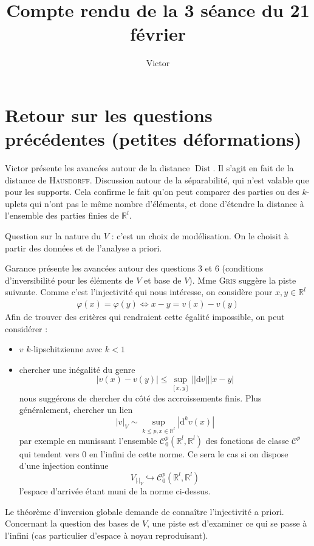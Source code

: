 \documentclass{article}
\title{Compte rendu de la 3\up{e} séance du 21 février}
\author{Victor}
\newcommand*{\Rl}{\mathbb{R}^l}
\newcommand*{\diff}{\mathrm{d}}
\DeclareMathOperator{\Dist}{Dist}
\begin{document}
\maketitle

\section{Retour sur les questions précédentes (petites déformations)}

Victor présente les avancées autour de la distance \( \Dist \). Il s'agit en fait de la distance de \textsc{Hausdorff}. Discussion autour de la séparabilité, qui n'est valable que pour les supports. Cela confirme le fait qu'on peut comparer des parties ou des \( k \)-uplets qui n'ont pas le même nombre d'éléments, et donc d'étendre la \og{}distance\fg{} à l'ensemble des parties finies de \( \Rl \).

Question sur la nature du \( V \) : c'est un choix de modélisation. On le choisit à partir des données et de l'analyse a priori.

Garance présente les avancées autour des questions 3 et 6 (conditions d'inversibilité pour les éléments de \( V \) et base de \( V \)). Mme \textsc{Gris} suggère la piste suivante. Comme c'est l'injectivité qui nous intéresse, on considère pour \( x, y \in \Rl \)
\begin{align*}
    \varphi(x) = \varphi(y) \iff x - y = v(x) - v(y)
\end{align*}
Afin de trouver des critères qui rendraient cette égalité impossible, on peut considérer :
\begin{itemize}
    \item \( v \) \(k\)-lipschitzienne avec \( k < 1\)
    \item chercher une inégalité du genre \[ |v(x)-v(y)| \leq \sup_{[x,y]} ||\diff v|| |x-y| \]
    nous suggérons de chercher du côté des accroissements finis.
    Plus généralement, chercher un lien \[ |v|_{V} \sim \sup_{k \leq p, x \in \Rl} |\diff^k v(x)| \] par exemple en munissant l'ensemble \( \mathcal{C}^p_0 (\Rl, \Rl) \) des fonctions de classe \( \mathcal{C}^p \) qui tendent vers 0 en l'infini de cette norme.
    Ce sera le cas si on dispose d'une injection continue \[ V_{|.|_V} \hookrightarrow \mathcal{C}^p_0 (\Rl, \Rl)\]
    l'espace d'arrivée étant muni de la norme ci-dessus.
\end{itemize}
Le théorème d'inversion globale demande de connaître l'injectivité a priori.
Concernant la question des bases de \( V \), une piste est d'examiner ce qui se passe à l'infini (cas particulier d'espace à noyau reproduisant).
\end{document}
